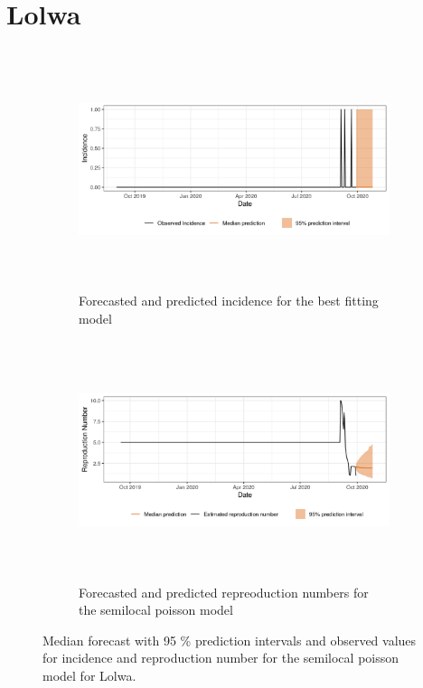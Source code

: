  \section{ Lolwa }\begin{figure}[H]\begin{subfigure}{\textwidth}  \centering  \includegraphics[width=0.9\linewidth, height=7cm]{../output/Lolwa_predictions.png}  \caption{Forecasted and predicted incidence for the best fitting model}\end{subfigure}

\begin{subfigure}{\textwidth}  \centering  \includegraphics[width=0.9\linewidth, height=7cm]{../output/Lolwa_Rs.png}  \caption{Forecasted and predicted repreoduction numbers for the semilocal poisson model}\end{subfigure}  \caption{Median forecast with 95 \% prediction intervals and observed values for incidence and reproduction number for the semilocal poisson model for Lolwa.}\end{figure}

